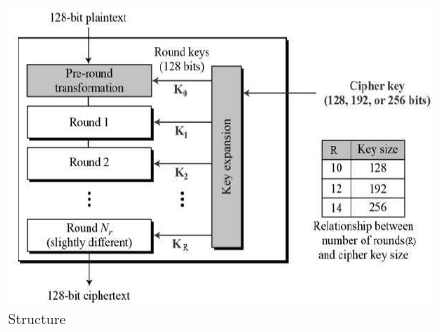 \begin{figure}[ht!]
  \centering
  \includegraphics[scale=0.35]{./Drawings/EDIN01-Cryptography/AES_Structure.jpg}
  \caption{ Structure}
  \label{fig:AES_Structure}
\end{figure}

